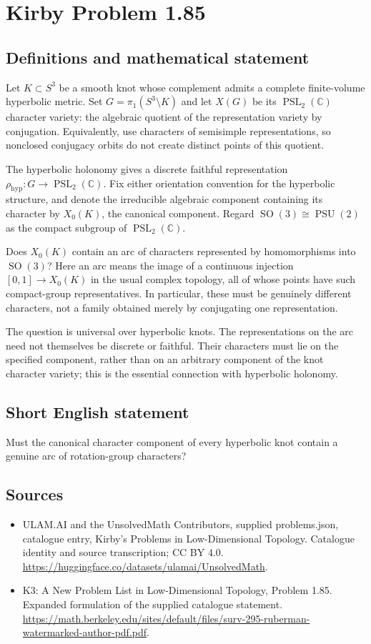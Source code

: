\documentclass[11pt,a4paper]{article}
\begin{document}
\section*{Kirby Problem 1.85}\label{statement}

\subsection{Definitions and mathematical statement}
Let $K\subset S^3$ be a smooth knot whose complement admits a complete finite-volume hyperbolic metric. Set $G=\pi_1(S^3\setminus K)$ and let $X(G)$ be its $\operatorname{PSL}_2(\mathbb C)$ character variety: the algebraic quotient of the representation variety by conjugation. Equivalently, use characters of semisimple representations, so nonclosed conjugacy orbits do not create distinct points of this quotient.

The hyperbolic holonomy gives a discrete faithful representation $\rho_{\mathrm{hyp}}:G\to\operatorname{PSL}_2(\mathbb C)$. Fix either orientation convention for the hyperbolic structure, and denote the irreducible algebraic component containing its character by $X_0(K)$, the canonical component. Regard $\operatorname{SO}(3)\cong\operatorname{PSU}(2)$ as the compact subgroup of $\operatorname{PSL}_2(\mathbb C)$.

Does $X_0(K)$ contain an arc of characters represented by homomorphisms into $\operatorname{SO}(3)$? Here an arc means the image of a continuous injection $[0,1]\to X_0(K)$ in the usual complex topology, all of whose points have such compact-group representatives. In particular, these must be genuinely different characters, not a family obtained merely by conjugating one representation.

The question is universal over hyperbolic knots. The representations on the arc need not themselves be discrete or faithful. Their characters must lie on the specified component, rather than on an arbitrary component of the knot character variety; this is the essential connection with hyperbolic holonomy.
\subsection{Short English statement}
Must the canonical character component of every hyperbolic knot contain a genuine arc of rotation-group characters?
\subsection{Sources}
\begin{itemize}
\item[S1] ULAM.AI and the UnsolvedMath Contributors, supplied problems.json, catalogue entry, Kirby's Problems in Low-Dimensional Topology. Catalogue identity and source transcription; CC BY 4.0.
\url{https://huggingface.co/datasets/ulamai/UnsolvedMath}.
\item[S2] K3: A New Problem List in Low-Dimensional Topology, Problem 1.85. Expanded formulation of the supplied catalogue statement.
\url{https://math.berkeley.edu/sites/default/files/surv-295-ruberman-watermarked-author-pdf.pdf}.
\end{itemize}
\end{document}
